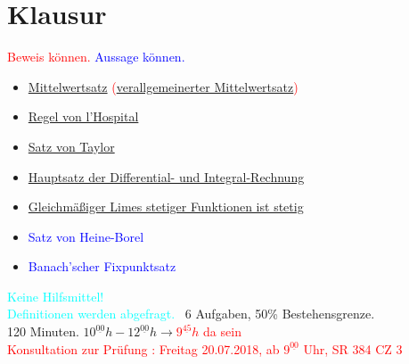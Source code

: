 \section*{Klausur}
\textcolor{red}{Beweis können.}
\textcolor{blue}{Aussage können.}
\begin{itemize}
	\item \textcolor{red}{\hyperref[vl_07_MWS]{Mittelwertsatz} (\hyperref[satz_9]{verallgemeinerter Mittelwertsatz})}
	\item \textcolor{blue}{\hyperref[regel_von_hospital]{Regel von l'Hospital}}
	\item \textcolor{red}{\hyperref[satz_von_taylor]{Satz von Taylor}}
	\item \textcolor{red}{\hyperref[vl_12_satz_01]{Hauptsatz der Differential- und Integral-Rechnung}}
	\item \textcolor{red}{\hyperref[vl_17_satz_2]{Gleichmäßiger Limes stetiger Funktionen ist stetig}}
	\item \textcolor{blue}{Satz von Heine-Borel}
	\item \textcolor{blue}{Banach'scher Fixpunktsatz}
\end{itemize}
\textcolor{cyan}{Keine Hilfsmittel!}\\
\textcolor{cyan}{Definitionen werden abgefragt.}
~6 Aufgaben, 50\% Bestehensgrenze.\\
120 Minuten. $10^{\underline{00}}h - 12^{\underline{00}}h \rightarrow$\textcolor{red}{$9^{\underline{45}}h$ da sein}\\

\textcolor{red}{Konsultation zur Prüfung : Freitag 20.07.2018, 
ab $9^{\underline{00}}$ Uhr, SR 384 CZ 3}